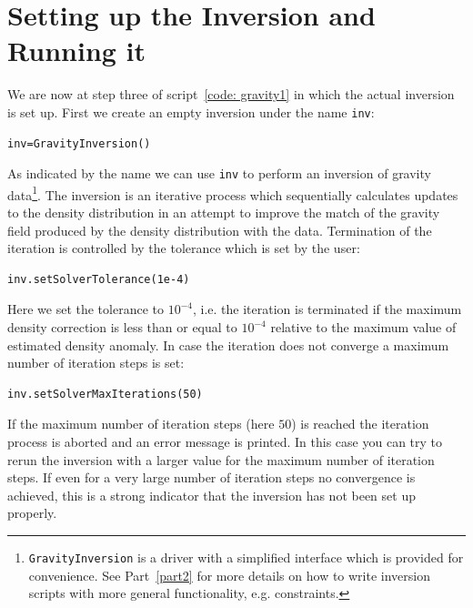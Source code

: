 \section{Setting up the Inversion and Running it}
We are now at step three of script~\ref{code: gravity1} in which the actual
inversion is set up.
First we create an empty inversion under the name \verb|inv|:
\begin{verbatim}
inv=GravityInversion()
\end{verbatim}
As indicated by the name we can use \verb|inv| to perform an inversion of
gravity data\footnote{\verb|GravityInversion| is a driver with a simplified
interface which is provided for convenience. See Part~\ref{part2} for more
details on how to write inversion scripts with more general functionality, e.g.
constraints.}. The inversion is an iterative process which sequentially
calculates updates to the density distribution in an attempt to improve the
match of the gravity field produced by the density distribution with the data.
Termination of the iteration is controlled by the tolerance which is set by
the user:
\begin{verbatim}
inv.setSolverTolerance(1e-4)
\end{verbatim}
Here we set the tolerance to $10^{-4}$, i.e. the iteration is terminated if
the maximum density correction is less than or equal to $10^{-4}$ relative to
the maximum value of estimated density anomaly.
In case the iteration does not converge a maximum number of iteration steps is
set:
\begin{verbatim}
inv.setSolverMaxIterations(50)
\end{verbatim}
If the maximum number of iteration steps (here $50$) is reached the iteration
process is aborted and an error message is printed.
In this case you can try to rerun the inversion with a larger value for the
maximum number of iteration steps.
If even for a very large number of iteration steps no convergence is achieved,
this is a strong indicator that the inversion has not been set up properly.

